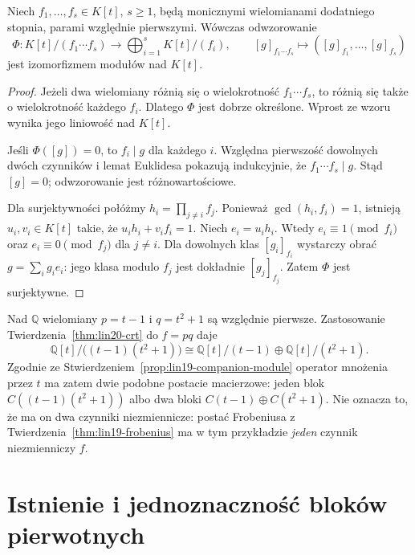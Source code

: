 \begin{twierdzenie}
\label{thm:lin20-crt}
Niech \(f_1,\ldots,f_s\in K[t]\),
\(s\ge1\), będą monicznymi wielomianami
dodatniego stopnia, parami względnie pierwszymi.
Wówczas odwzorowanie
\[
 \Phi\colon K[t]/(f_1\cdots f_s)
 \longrightarrow\bigoplus_{i=1}^{s}K[t]/(f_i),
 \qquad
 [g]_{f_1\cdots f_s}\longmapsto
       ([g]_{f_1},\ldots,[g]_{f_s})
\]
jest izomorfizmem modułów nad \(K[t]\).
\end{twierdzenie}
\begin{proof}
Jeżeli dwa wielomiany różnią się
o wielokrotność \(f_1\cdots f_s\),
to różnią się także o wielokrotność
każdego \(f_i\). Dlatego \(\Phi\)
jest dobrze określone.
Wprost ze wzoru wynika jego liniowość
nad \(K[t]\).

Jeśli \(\Phi([g])=0\), to
\(f_i\mid g\) dla każdego \(i\).
Względna pierwszość dowolnych dwóch
czynników i lemat Euklidesa pokazują
indukcyjnie, że \(f_1\cdots f_s\mid g\).
Stąd \([g]=0\); odwzorowanie jest różnowartościowe.

Dla surjektywności połóżmy
\(h_i=\prod_{j\ne i}f_j\).
Ponieważ \(\gcd(h_i,f_i)=1\),
istnieją \(u_i,v_i\in K[t]\) takie, że
\(u_ih_i+v_if_i=1\).
Niech \(e_i=u_ih_i\).
Wtedy \(e_i\equiv1\pmod{f_i}\)
oraz \(e_i\equiv0\pmod{f_j}\)
dla \(j\ne i\).
Dla dowolnych klas \([g_i]_{f_i}\)
wystarczy obrać
\(g=\sum_i g_i e_i\):
jego klasa modulo \(f_j\) jest
dokładnie \([g_j]_{f_j}\).
Zatem \(\Phi\) jest surjektywne.
\end{proof}

\begin{przyklad}
\label{prz:lin20-crt}
Nad \(\mathbb Q\) wielomiany
\(p=t-1\) i \(q=t^2+1\)
są względnie pierwsze.
Zastosowanie Twierdzenia~\ref{thm:lin20-crt}
do \(f=pq\) daje
\[
 \mathbb Q[t]/\bigl((t-1)(t^2+1)\bigr)
 \cong \mathbb Q[t]/(t-1)\oplus
          \mathbb Q[t]/(t^2+1).
\]
Zgodnie ze Stwierdzeniem~\ref{prop:lin19-companion-module}
operator mnożenia przez \(t\)
ma zatem dwie podobne postacie macierzowe:
jeden blok \(C((t-1)(t^2+1))\)
albo dwa bloki \(C(t-1)\oplus C(t^2+1)\).
Nie oznacza to, że ma on dwa
czynniki niezmiennicze:
postać Frobeniusa z
Twierdzenia~\ref{thm:lin19-frobenius}
ma w tym przykładzie \emph{jeden}
czynnik niezmienniczy \(f\).
\end{przyklad}

\section{Istnienie i jednoznaczność bloków pierwotnych}
\label{sec:lin20-primary-blocks}

